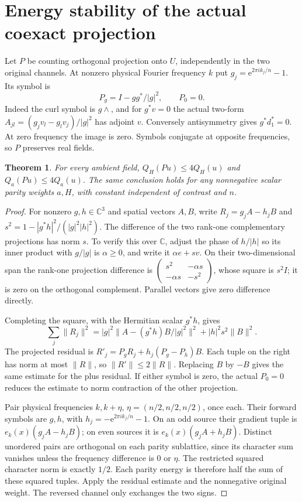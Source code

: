 \documentclass[11pt,a4paper]{article}
\newtheorem{theorem}{Theorem}[section]
\newcommand{\C}{\mathbb C}
\newcommand{\norm}[1]{\lVert#1\rVert}
\newcommand{\e}{\mathrm e}
\begin{document}
\section{Energy stability of the actual coexact projection}\label{projection}
Let $P$ be counting orthogonal projection onto $U$, independently in the two
original channels. At nonzero physical Fourier frequency $k$ put
$g_j=\e^{2\pi i k_j/n}-1$. Its symbol is
\begin{equation}\label{P}
 P_g=I-gg^*/|g|^2,\qquad P_0=0.
\end{equation}
Indeed the curl symbol is $g\wedge$, and for $g^*v=0$ the actual two-form
$A_{jl}=(g_jv_l-g_lv_j)/|g|^2$ has adjoint $v$. Conversely antisymmetry
gives $g^*d_1^*=0$. At zero frequency the image is zero. Symbols conjugate
at opposite frequencies, so $P$ preserves real fields.

\begin{theorem}\label{stableP}
For every ambient field, $Q_H(Pu)\leq4Q_H(u)$ and
$Q_a(Pu)\leq4Q_a(u)$. The same conclusion holds for any nonnegative scalar
parity weights $a,H$, with constant independent of contrast and $n$.
\end{theorem}
\begin{proof}
For nonzero $g,h\in\C^3$ and spatial vectors $A,B$, write
$R_j=g_jA-h_jB$ and $s^2=1-|g^*h|^2/(|g|^2|h|^2)$. The difference of
the two rank-one complementary projections has norm $s$. To verify this
over $\C$, adjust the phase of $h/|h|$ so its inner product with $g/|g|$
is $\alpha\geq0$, and write it $\alpha e+sv$. On their two-dimensional
span the rank-one projection difference is
$\left(\begin{smallmatrix}s^2&-\alpha s\\-\alpha s&-s^2\end{smallmatrix}\right)$,
whose square is $s^2I$; it is zero on the orthogonal complement. Parallel
vectors give zero difference directly.

Completing the square, with the Hermitian scalar $g^*h$, gives
\[
 \sum_j\norm{R_j}^2=|g|^2\norm{A-(g^*h)B/|g|^2}^2
                           +|h|^2s^2\norm B^2.
\]
The projected residual is
$R'_j=P_gR_j+h_j(P_g-P_h)B$. Each tuple on the right has norm at most
$\norm R$, so $\norm{R'}\leq2\norm R$. Replacing $B$ by $-B$ gives the
same estimate for the plus residual. If either symbol is zero, the actual
$P_0=0$ reduces the estimate to norm contraction of the other projection.

Pair physical frequencies $k,k+\eta$, $\eta=(n/2,n/2,n/2)$, once each.
Their forward symbols are $g,h$, with $h_j=-\e^{2\pi i k_j/n}-1$.
On an odd source their gradient tuple is $e_k(x)(g_jA-h_jB)$; on even
sources it is $e_k(x)(g_jA+h_jB)$. Distinct unordered pairs are orthogonal
on each parity sublattice, since its character sum vanishes unless the
frequency difference is $0$ or $\eta$. The restricted squared character
norm is exactly $1/2$. Each parity energy is therefore half the sum of
these squared tuples. Apply the residual estimate and the nonnegative
original weight. The reversed channel only exchanges the two signs.
\end{proof}
\end{document}
